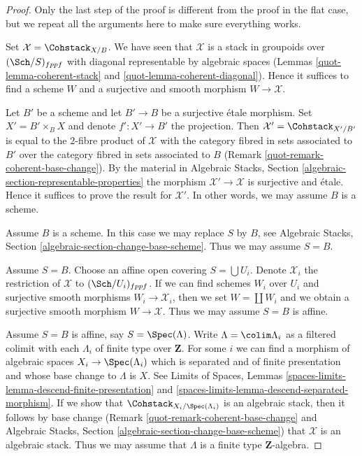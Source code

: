 \begin{proof}

Only the last step of the proof is different from the proof
in the flat case, but we repeat all the arguments here to make
sure everything works.

\medskip\noindent
Set $\mathcal{X} = \Cohstack_{X/B}$. We have seen that $\mathcal{X}$
is a stack in groupoids over $(\Sch/S)_{fppf}$ with diagonal representable
by algebraic spaces
(Lemmas \ref{quot-lemma-coherent-stack} and \ref{quot-lemma-coherent-diagonal}).
Hence it suffices to find a scheme $W$ and a surjective and smooth
morphism $W \to \mathcal{X}$.

\medskip\noindent
Let $B'$ be a scheme and let $B' \to B$ be a surjective \'etale morphism.
Set $X' = B' \times_B X$ and denote $f' : X' \to B'$ the projection.
Then $\mathcal{X}' = \Cohstack_{X'/B'}$ is equal to the $2$-fibre
product of $\mathcal{X}$ with the category fibred in sets
associated to $B'$ over the category fibred in sets associated to $B$
(Remark \ref{quot-remark-coherent-base-change}). By the material in
Algebraic Stacks, Section \ref{algebraic-section-representable-properties}
the morphism $\mathcal{X}' \to \mathcal{X}$ is surjective and \'etale.
Hence it suffices to prove the result for $\mathcal{X}'$.
In other words, we may assume $B$ is a scheme.

\medskip\noindent
Assume $B$ is a scheme. In this case we may replace $S$ by $B$, see
Algebraic Stacks, Section \ref{algebraic-section-change-base-scheme}.
Thus we may assume $S = B$.

\medskip\noindent
Assume $S = B$. Choose an affine open covering $S = \bigcup U_i$.
Denote $\mathcal{X}_i$ the restriction of $\mathcal{X}$ to
$(\Sch/U_i)_{fppf}$. If we can find schemes $W_i$ over $U_i$ and
surjective smooth morphisms $W_i \to \mathcal{X}_i$, then we
set $W = \coprod W_i$ and we obtain a surjective smooth morphism
$W \to \mathcal{X}$. Thus we may assume $S = B$ is affine.

\medskip\noindent
Assume $S = B$ is affine, say $S = \Spec(\Lambda)$.
Write $\Lambda = \colim \Lambda_i$ as a filtered colimit with each $\Lambda_i$
of finite type over $\mathbf{Z}$. For some $i$ we can find
a morphism of algebraic spaces $X_i \to \Spec(\Lambda_i)$
which is separated and of finite presentation and whose base change
to $\Lambda$ is $X$. See Limits of Spaces, Lemmas
\ref{spaces-limits-lemma-descend-finite-presentation} and
\ref{spaces-limits-lemma-descend-separated-morphism}.
If we show that $\Cohstack_{X_i/\Spec(\Lambda_i)}$ is an
algebraic stack, then it follows by base change
(Remark \ref{quot-remark-coherent-base-change} and
Algebraic Stacks, Section \ref{algebraic-section-change-base-scheme})
that $\mathcal{X}$ is an algebraic stack.
Thus we may assume that $\Lambda$ is a finite type $\mathbf{Z}$-algebra.


\end{proof}
